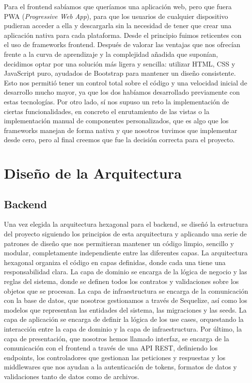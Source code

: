 Para el frontend sabíamos que queríamos una aplicación web, pero que fuera PWA (\textit{Progressive Web App}), para que los usuarios 
de cualquier dispositivo pudieran acceder a ella y descargarla sin la necesidad de tener que crear una aplicación nativa para 
cada plataforma. Desde el principio fuimos reticentes con el uso de frameworks frontend. Después de valorar las ventajas que 
nos ofrecían frente a la curva de aprendizaje y la complejidad añadida que suponían, decidimos optar por una solución más ligera 
y sencilla: utilizar HTML, CSS y JavaScript puro, ayudados de Bootstrap para mantener un diseño consistente. Esto nos permitió 
tener un control total sobre el código y una velocidad inicial de desarrollo mucho mayor, ya que los dos habíamos desarrollado 
previamente con estas tecnologías. Por otro lado, sí nos supuso un reto la implementación de ciertas funcionalidades, en 
concreto el enrutamiento de las vistas o la implementación manual de componentes personalizados, que es algo que los 
frameworks manejan de forma nativa y que nosotros tuvimos que implementar desde cero, pero al final creemos que fue la decisión 
correcta para el proyecto. 


\section{Diseño de la Arquitectura}

\subsection{Backend}

Una vez elegida la arquitectura hexagonal para el backend, se diseñó la estructura del proyecto siguiendo los principios de 
esta arquitectura y aplicando una serie de patrones de diseño que nos permitieran mantener un código limpio, sencillo y modular, 
completamente independiente entre las diferentes capas. La arquitectura hexagonal organiza el código en capas definidas, 
donde cada una tiene una responsabilidad clara. La capa de dominio se encarga de la lógica de negocio y las reglas del sistema, 
donde se definen todos los contratos y validaciones sobre los objetos que se procesan. La capa de infraestructura se encarga
de la comunicación con la base de datos, que nosotros gestionamos a través de Sequelize, así como los modelos que representan
las entidades del sistema, las migraciones y las seeds. La capa de aplicación se encarga de definir la lógica de los use 
cases, orquestando la interacción entre la capa de dominio y la capa de infraestructura. Por último, la capa de presentación, 
que nosotros hemos llamado interfaz, se encarga de la comunicación con el frontend a través de una API REST, definiendo los 
endpoints, los controladores que gestionan las peticiones y respuestas y los middlewares que nos ayudan a la autenticación 
de tokens, formatos de datos y validaciones tanto de datos como de archivos.

